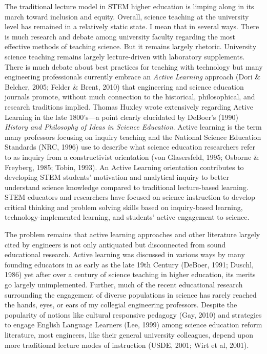\documentclass[11.5pt]{sig-alternate} %
\begin{document}
\begin{large}
The traditional lecture model in STEM higher education is limping along in its march toward inclusion and equity. Overall, science teaching at the university level has remained in a relatively static state.  I mean that in several ways.  There is much research and debate among university faculty regarding the most effective methods of teaching science.  But it remains largely rhetoric.  University science teaching remains largely lecture-driven with laboratory supplements.  There is much debate about best practices for teaching with technology but many engineering professionals currently embrace an \textit{Active Learning} approach (Dori \& Belcher, 2005; Felder \& Brent, 2010) that engineering and science education journals promote, without much connection to the historical, philosophical, and research traditions implied.  Thomas Huxley wrote extensively regarding Active Learning in the late 1800’s—a point clearly elucidated by DeBoer’s (1990) \textit{History and Philosophy of Ideas in Science Education}. Active learning is the term many professors focusing on inquiry teaching and the National Science Education Standards (NRC, 1996) use to describe what science education researchers refer to as inquiry from a constructivist orientation (von Glasersfeld, 1995; Osborne \& Freyberg, 1985; Tobin, 1993).  An Active Learning orientation contributes to developing STEM students’ motivation and analytical inquiry to better understand science knowledge compared to traditional lecture-based learning.  STEM educators and researchers have focused on science instruction to develop critical thinking and problem solving skills based on inquiry-based learning, technology-implemented learning, and students’ active engagement to science. 

The problem remains that active learning approaches and other literature largely cited by engineers is not only antiquated but disconnected from sound educational research. Active learning was discussed in various ways by many founding educators in as early as the late 19th Century (DeBoer, 1991; Duschl, 1986) yet after over a century of science teaching in higher education, its merits go largely unimplemented.  Further, much of the recent educational research surrounding the engagement of diverse populations in science has rarely reached the hands, eyes, or ears of my collegial engineering professors.   Despite the popularity of notions like cultural responsive pedagogy (Gay, 2010) and strategies to engage English Language Learners (Lee, 1999) among science education reform literature, most engineers, like their general university colleagues, depend upon more traditional lecture modes of instruction (USDE, 2001; Wirt et al, 2001).  


\end{large}
\end{document}

